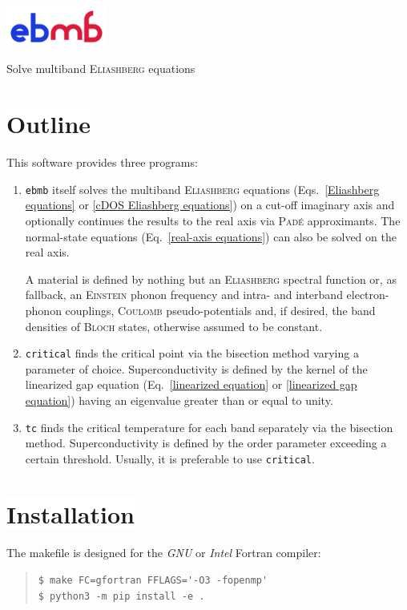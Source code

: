 \documentclass[a4paper]{article}
\newlength\gap
\def\headline#1{\section*{%
   \normalsize\normalfont%
   \rlap{\rule[0.5ex]\textwidth{0.4pt}}%
   \qquad\colorbox{white}{#1}%
   }}
\begin{document}
   \begin{center}
      \includegraphics[width=33mm]{../logo/ebmb} \par \bigskip
      \large Solve multiband \textsc{Eliashberg} equations
   \end{center}

   \headline{Outline}

   This software provides three programs:
   \begin{enumerate}
      \item
         \texttt{ebmb} itself solves the multiband \textsc{Eliashberg} equations
         (Eqs.~\ref{Eliashberg equations} or \ref{cDOS Eliashberg equations}) on
         a cut-off imaginary axis and optionally continues the results to the
         real axis via \textsc{Padé} approximants. The normal-state equations
         (Eq.~\ref{real-axis equations}) can also be solved on the real axis.

         A material is defined by nothing but an \textsc{Eliashberg} spectral
         function or, as fallback, an \textsc{Einstein} phonon frequency and
         intra- and interband electron-phonon couplings, \textsc{Coulomb}
         pseudo-potentials and, if desired, the band densities of \textsc{Bloch}
         states, otherwise assumed to be constant.

      \item
         \texttt{critical} finds the critical point via the bisection method
         varying a parameter of choice. Superconductivity is defined by the
         kernel of the linearized gap equation (Eq.~\ref{linearized equation}
         or \ref{linearized gap equation}) having an eigenvalue greater than or
         equal to unity.

      \item
         \texttt{tc} finds the critical temperature for each band separately via
         the bisection method. Superconductivity is defined by the order
         parameter exceeding a certain threshold. Usually, it is preferable to
         use \texttt{critical}.

   \end{enumerate}

   \headline{Installation}

   The makefile is designed for the \emph{GNU} or \emph{Intel} Fortran compiler:
   \begin{quote}
      \verb|$ make FC=gfortran FFLAGS='-O3 -fopenmp'| \\
      \verb|$ python3 -m pip install -e .|
   \end{quote}
\end{document}
